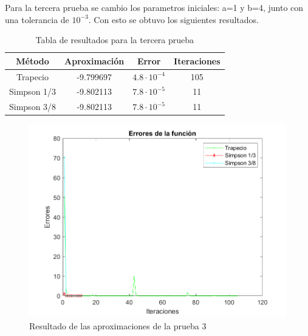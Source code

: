 \par Para la tercera prueba se cambio los parametros iniciales: a=1 y b=4, junto con una tolerancia de $10^{-3}$. Con esto se obtuvo los siguientes resultados.

\begin{table}[htp]
	\centering
	\begin{tabular}{ |c|c|c|c|}
		\hline
		\textbf{Método} & \textbf{Aproximación} & \textbf{Error} & \textbf{Iteraciones} \\
		\hline
		Trapecio & -9.799697 & $4.8 \cdot 10^{-4}$ & 105  \\
		\hline
		Simpson 1/3 & -9.802113 & $7.8 \cdot 10^{-5}$ & 11  \\
		\hline
		Simpson 3/8 & -9.802113 & $7.8 \cdot 10^{-5}$ & 11 \\
		\hline
	\end{tabular}
	\caption{Tabla de resultados para la tercera prueba}
	\label{tab:tab3}
\end{table}

\begin{figure}[!ht]
	\centering
	\includegraphics[scale=0.8]{Imagenes/erroresFuncion3.png}
	\caption{Resultado de las aproximaciones de la prueba 3}
	\label{fig:ej}
\end{figure}


